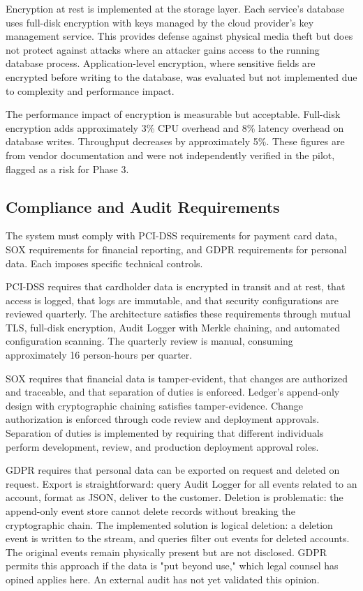Encryption at rest is implemented at the storage layer. Each service's database uses full-disk encryption with keys managed by the cloud provider's key management service. This provides defense against physical media theft but does not protect against attacks where an attacker gains access to the running database process. Application-level encryption, where sensitive fields are encrypted before writing to the database, was evaluated but not implemented due to complexity and performance impact.

The performance impact of encryption is measurable but acceptable. Full-disk encryption adds approximately 3\% CPU overhead and 8\% latency overhead on database writes. Throughput decreases by approximately 5\%. These figures are from vendor documentation and were not independently verified in the pilot, flagged as a risk for Phase 3.

\subsection{Compliance and Audit Requirements}

The system must comply with PCI-DSS requirements for payment card data, SOX requirements for financial reporting, and GDPR requirements for personal data. Each imposes specific technical controls.

PCI-DSS requires that cardholder data is encrypted in transit and at rest, that access is logged, that logs are immutable, and that security configurations are reviewed quarterly. The architecture satisfies these requirements through mutual TLS, full-disk encryption, Audit Logger with Merkle chaining, and automated configuration scanning. The quarterly review is manual, consuming approximately 16 person-hours per quarter.

SOX requires that financial data is tamper-evident, that changes are authorized and traceable, and that separation of duties is enforced. Ledger's append-only design with cryptographic chaining satisfies tamper-evidence. Change authorization is enforced through code review and deployment approvals. Separation of duties is implemented by requiring that different individuals perform development, review, and production deployment approval roles.

GDPR requires that personal data can be exported on request and deleted on request. Export is straightforward: query Audit Logger for all events related to an account, format as JSON, deliver to the customer. Deletion is problematic: the append-only event store cannot delete records without breaking the cryptographic chain. The implemented solution is logical deletion: a deletion event is written to the stream, and queries filter out events for deleted accounts. The original events remain physically present but are not disclosed. GDPR permits this approach if the data is "put beyond use," which legal counsel has opined applies here. An external audit has not yet validated this opinion.

